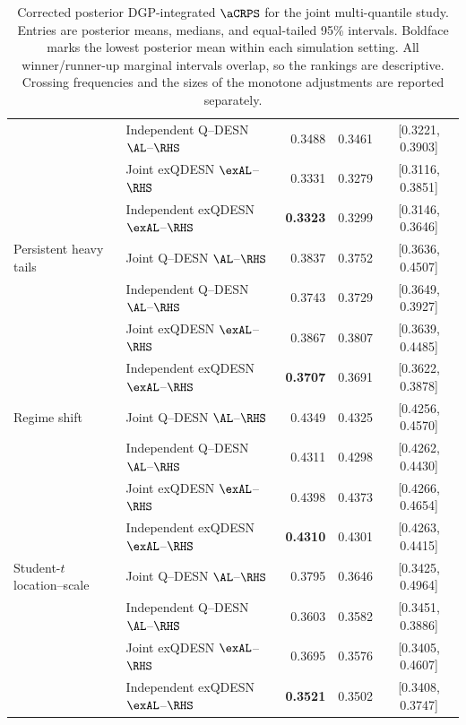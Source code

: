 \begin{table}[p]
{\begin{tabular}{@{}>{\raggedright\arraybackslash}p{}>{\raggedright\arraybackslash}p{}rrc@{}}
 & Independent Q--DESN \(\AL\)--\(\RHS\) & 0.3488 & 0.3461 & [0.3221, 0.3903] \\
 & Joint exQDESN \(\exAL\)--\(\RHS\) & 0.3331 & 0.3279 & [0.3116, 0.3851] \\
 & Independent exQDESN \(\exAL\)--\(\RHS\) & \textbf{0.3323} & 0.3299 & [0.3146, 0.3646] \\
\addlinespace[2pt]
Persistent heavy tails & Joint Q--DESN \(\AL\)--\(\RHS\) & 0.3837 & 0.3752 & [0.3636, 0.4507] \\
 & Independent Q--DESN \(\AL\)--\(\RHS\) & 0.3743 & 0.3729 & [0.3649, 0.3927] \\
 & Joint exQDESN \(\exAL\)--\(\RHS\) & 0.3867 & 0.3807 & [0.3639, 0.4485] \\
 & Independent exQDESN \(\exAL\)--\(\RHS\) & \textbf{0.3707} & 0.3691 & [0.3622, 0.3878] \\
\addlinespace[2pt]
Regime shift & Joint Q--DESN \(\AL\)--\(\RHS\) & 0.4349 & 0.4325 & [0.4256, 0.4570] \\
 & Independent Q--DESN \(\AL\)--\(\RHS\) & 0.4311 & 0.4298 & [0.4262, 0.4430] \\
 & Joint exQDESN \(\exAL\)--\(\RHS\) & 0.4398 & 0.4373 & [0.4266, 0.4654] \\
 & Independent exQDESN \(\exAL\)--\(\RHS\) & \textbf{0.4310} & 0.4301 & [0.4263, 0.4415] \\
\addlinespace[2pt]
Student-\(t\) location--scale & Joint Q--DESN \(\AL\)--\(\RHS\) & 0.3795 & 0.3646 & [0.3425, 0.4964] \\
 & Independent Q--DESN \(\AL\)--\(\RHS\) & 0.3603 & 0.3582 & [0.3451, 0.3886] \\
 & Joint exQDESN \(\exAL\)--\(\RHS\) & 0.3695 & 0.3576 & [0.3405, 0.4607] \\
 & Independent exQDESN \(\exAL\)--\(\RHS\) & \textbf{0.3521} & 0.3502 & [0.3408, 0.3747] \\
\bottomrule
\end{tabular}
}%
\caption{Corrected posterior DGP-integrated \(\aCRPS\) for the joint multi-quantile study. Entries are posterior means, medians, and equal-tailed 95\% intervals. Boldface marks the lowest posterior mean within each simulation setting. All winner/runner-up marginal intervals overlap, so the rankings are descriptive. Crossing frequencies and the sizes of the monotone adjustments are reported separately.}
\label{qdesn:tab:joint-qdesn-corrected-v4-score}
\end{table}
